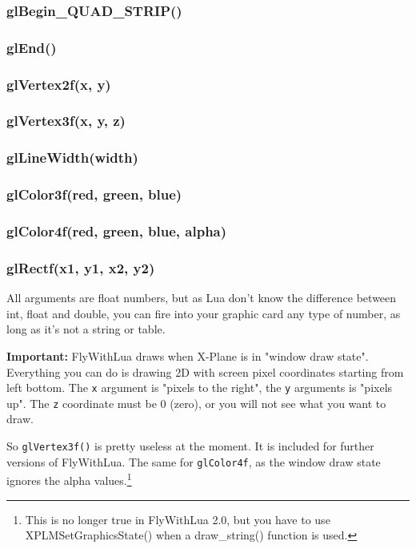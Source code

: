\documentclass[11pt,parskip=half,a4paper]{scrartcl}
\begin{document}
\subsubsection{glBegin\_QUAD\_STRIP()}

\subsubsection{glEnd()}

\subsubsection{glVertex2f(x, y)}

\subsubsection{glVertex3f(x, y, z)}

\newpage

\subsubsection{glLineWidth(width)}

\subsubsection{glColor3f(red, green, blue)}

\subsubsection{glColor4f(red, green, blue, alpha)}

\subsubsection{glRectf(x1, y1, x2, y2)}

All arguments are float numbers, but as Lua don't know the difference between int, float and double, you can fire into your graphic card any type of number, as long as it's not a string or table.

\textbf{Important:} FlyWithLua draws when X-Plane is in "window draw state". Everything you can do is drawing 2D with screen pixel coordinates starting from left bottom. The \verb|x| argument is "pixels to the right", the \verb|y| arguments is "pixels up". The \verb|z| coordinate must be 0 (zero), or you will not see what you want to draw.

So \verb|glVertex3f()| is pretty useless at the moment. It is included for further versions of FlyWithLua. The same for \verb|glColor4f|, as the window draw state ignores the alpha values.\footnote{This is no longer true in FlyWithLua 2.0, but you have to use XPLMSetGraphicsState() when a draw\_string() function is used.}
\end{document}
